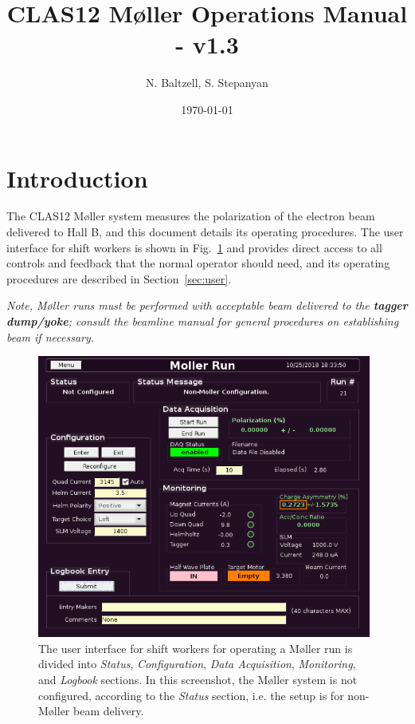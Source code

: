\documentclass[amsmath,amssymb,notitlepage,12pt]{revtex4}
\begin{document}
\title{CLAS12 M{\o}ller Operations Manual - v1.3}
\date{\today}
\author{N. Baltzell, S. Stepanyan}
\begin{abstract}
\end{abstract}

\maketitle

\section{Introduction}
The CLAS12 M{\o}ller system measures the polarization of the electron beam delivered to Hall B, and this document details its operating procedures.  The user interface for shift workers is shown in Fig.~\ref{fig:unconfig} and provides direct access to all controls and feedback that the normal operator should need, and its operating procedures are described in Section~\ref{sec:user}.%

{\em \large Note, M{\o}ller runs must be performed with acceptable beam delivered to the {\bf tagger dump/yoke};  consult the beamline manual for general procedures on establishing beam if necessary.}

\begin{figure}[htbp]\centering
    \includegraphics[width=11cm]{pics/unconfig}
    \caption{The user interface for shift workers for operating a M{\o}ller run is divided into {\em Status}, {\em Configuration}, {\em Data Acquisition}, {\em Monitoring}, and {\em Logbook} sections.  In this screenshot, the M{\o}ller system is not configured, according to the {\em Status} section, i.e. the setup is for non-M{\o}ller beam delivery.\label{fig:unconfig}}
\end{figure}
\end{document}
